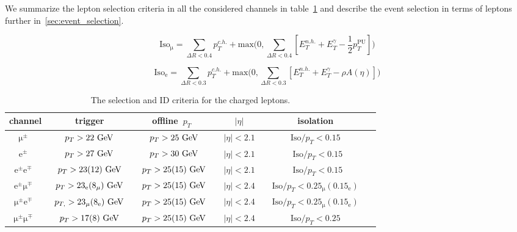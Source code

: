 We summarize the lepton selection criteria in all the considered channels in table~\cref{tab:lepton_selection} and describe the event selection in terms of leptons further in~\cref{sec:event_selection}.

\begin{equation}
\label{eq:iso_mu}
\mathrm{Iso}_{\mathrm{\mu}} = \sum_{\Delta R < 0.4} p_T^{c.h.} + \mathrm{max}\biggl(0, \sum_{\Delta R < 0.4} [E_T^{n.h.} + E_T^{\gamma} - \frac{1}{2} p_T^{\mathrm{PU}}] \biggr)
\end{equation}

\begin{equation}
\label{eq:iso_el}
\mathrm{Iso}_{\mathrm{e}} = \sum_{\Delta R < 0.3} p_T^{c.h.} + \mathrm{max}\biggl(0, \sum_{\Delta R < 0.3} [E_T^{n.h.} + E_T^{\gamma} - \rho A(\eta)] \biggr)
\end{equation}

\begin{table}[h!]
\begin{center}
\caption{The selection and ID criteria for the charged leptons.}
\label{tab:lepton_selection}
\begin{tabular}{c|ccccc}
\hline
channel & trigger & offline~$p_T$~&~$|\eta|$~& isolation \\
\hline
$\mathrm{\mu}^\pm$~&~$p_T > 22~\mathrm{GeV}$~&~$p_T > 25~\mathrm{GeV}$~&~$|\eta| < 2.1$~& ~$\mathrm{Iso}/p_T < 0.15$~\\

$\mathrm{e}^\pm$~&~$p_T > 27~\mathrm{GeV}$~&~$p_T > 30~\mathrm{GeV}$~&~$|\eta| < 2.1$~&~$\mathrm{Iso}/p_T < 0.15$\\

$\mathrm{e}^\pm\mathrm{e}^\mp$~&~$p_T > 23 (12)~\mathrm{GeV}$~&~$p_T > 25 (15)~\mathrm{GeV}$~&~$|\eta| < 2.1$~&~$\mathrm{Iso}/p_T < 0.15$\\

$\mathrm{e}^\pm\mathrm{\mu}^\mp$~&~$p_{T} > 23_{\mathrm{e}} (8_{\mathrm{\mu}})~\mathrm{GeV}$~&~$p_T > 25 (15)~\mathrm{GeV}$~&~$|\eta| < 2.4$~&~$\mathrm{Iso}/p_T < 0.25_{\mathrm{\mu}} (0.15_{\mathrm{e}})$~\\

$\mathrm{\mu}^\pm\mathrm{e}^\mp$~&~$p_{T,} > 23_{\mathrm{\mu}} (8_{\mathrm{e}})~\mathrm{GeV}$~&~$p_T > 25 (15)~\mathrm{GeV}$~&~$|\eta| < 2.4$~&~$\mathrm{Iso}/p_T < 0.25_{\mathrm{\mu}} (0.15_{\mathrm{e}})$~\\

$\mathrm{\mu}^\pm\mathrm{\mu}^\mp$~&~$p_T > 17 (8)~\mathrm{GeV}$~&~$p_T > 25 (15)~\mathrm{GeV}$~&~$|\eta| < 2.4$~&~$\mathrm{Iso}/p_T < 0.25$~\\

\hline
\hline
\end{tabular}
\end{center}
\end{table}

